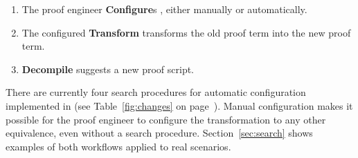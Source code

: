 \begin{enumerate}
\item The proof engineer \textbf{Configure}s \toolname, either manually or automatically.
\item The configured \textbf{Transform} transforms the old proof term into the new proof term.
\item \textbf{Decompile} suggests a new proof script. %
\end{enumerate}
There are currently four search procedures for automatic configuration implemented in \toolname (see Table~\ref{fig:changes} on page~\pageref{fig:changes}).
Manual configuration makes it possible
for the proof engineer to configure the transformation to any other equivalence,
even without a search procedure.
Section~\ref{sec:search} shows examples of both workflows applied to real scenarios.


